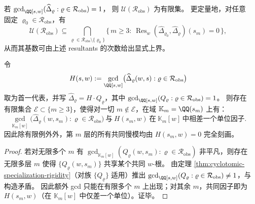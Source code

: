\begin{corollary}[有限可证伪性：无统一扇区 \texorpdfstring{$\Rightarrow$}{=>} 共同慢模层必有限]\label{cor:cyclotomic-specialization-falsifiability}
若
\(
\gcd_{\QQ[s,w]}(\widehat{\Delta}_{\varrho}:\varrho\in\mathcal{R}_{\mathrm{obs}})=1
\)，
则 \(\mathcal{U}(\mathcal{R}_{\mathrm{obs}})\) 为有限集。
更定量地，对任意固定 \(\varrho_0\in\mathcal{R}_{\mathrm{obs}}\)，有
\[
\mathcal{U}(\mathcal{R}_{\mathrm{obs}})
\subseteq
\bigcap_{\varrho\in\mathcal{R}_{\mathrm{obs}}\setminus\{\varrho_0\}}
\bigl\{\,m\ge 3:\ \operatorname{Res}_{w}(\widehat{\Delta}_{\varrho_0},\widehat{\Delta}_{\varrho})(s_m)=0\,\bigr\},
\]
从而其基数可由上述 resultants 的次数给出显式上界。
\end{corollary}

\begin{theorem}\label{thm:cyclotomic-gcd-stability}
令
\[
H(s,w):=\gcd_{\QQ[s,w]}\bigl(\widehat{\Delta}_{\varrho}(w,s):\varrho\in\mathcal{R}_{\mathrm{obs}}\bigr)
\]
取为首一代表，并写 \(\widehat{\Delta}_{\varrho}=H\cdot Q_{\varrho}\)，其中
\(
\gcd_{\QQ[s,w]}(Q_{\varrho}:\varrho\in\mathcal{R}_{\mathrm{obs}})=1
\)。
则存在有限集合 \(\mathcal{E}\subset\{m\ge 3\}\)，使得对一切 \(m\notin\mathcal{E}\)，在域 \(\mathbb{K}_m=\QQ(s_m)\) 上有：
\[
\gcd_{\mathbb{K}_m[w]}\bigl(\widehat{\Delta}_{\varrho}(w,s_m):\varrho\in\mathcal{R}_{\mathrm{obs}}\bigr)
\ \text{与}\ H(s_m,w)\ \text{在}\ \mathbb{K}_m[w]\ \text{中相差一个单位因子}.
\]
因此除有限例外外，第 \(m\) 层的所有共同慢模均由 \(H(s_m,w)=0\) 完全刻画。
\end{theorem}
\begin{proof}
若对无限多个 \(m\) 有
\(
\gcd_{\mathbb{K}_m[w]}(Q_{\varrho}(w,s_m):\varrho\in\mathcal{R}_{\mathrm{obs}})
\)
非平凡，则存在无限多层 \(m\) 使得 \(\{Q_{\varrho}(w,s_m)\}\) 共享某个共同 \(w\)-根。
由定理 \ref{thm:cyclotomic-specialization-rigidity}（对族 \(\{Q_{\varrho}\}\) 适用）推出
\(
\gcd_{\QQ[s,w]}(Q_{\varrho}:\varrho\in\mathcal{R}_{\mathrm{obs}})\neq 1
\)，与构造矛盾。
因此额外 gcd 只能在有限多个 \(m\) 上出现；对其余 \(m\)，共同因子即为 \(H(s_m,w)\)（在 \(\mathbb{K}_m[w]\) 中仅差一个单位）。证毕。
\end{proof}

